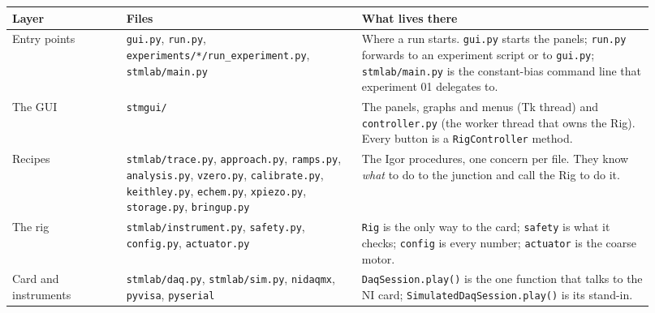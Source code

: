 \small\setlength{\LTleft}{0pt}\setlength{\LTright}{\fill}
\begin{longtable}{@{}>{\raggedright\arraybackslash}p{0.167\linewidth}>{\raggedright\arraybackslash}p{0.335\linewidth}>{\raggedright\arraybackslash}p{0.418\linewidth}@{}}
\toprule
\textbf{Layer} & \textbf{Files} & \textbf{What lives there} \\
\midrule\endhead
Entry points & \texttt{gui.\discretionary{}{}{}py}, \texttt{run.\discretionary{}{}{}py}, \texttt{experiments/\discretionary{}{}{}*/\discretionary{}{}{}run\_\discretionary{}{}{}experiment.\discretionary{}{}{}py}, \texttt{stmlab/\discretionary{}{}{}main.\discretionary{}{}{}py} & Where a run starts. \texttt{gui.\discretionary{}{}{}py} starts the panels; \texttt{run.\discretionary{}{}{}py} forwards to an experiment script or to \texttt{gui.\discretionary{}{}{}py}; \texttt{stmlab/\discretionary{}{}{}main.\discretionary{}{}{}py} is the constant-bias command line that experiment 01 delegates to. \\
The GUI & \texttt{stmgui/\discretionary{}{}{}} & The panels, graphs and menus (Tk thread) and \texttt{controller.\discretionary{}{}{}py} (the worker thread that owns the Rig). Every button is a \texttt{Rig\discretionary{}{}{}Controller} method. \\
Recipes & \texttt{stmlab/\discretionary{}{}{}trace.\discretionary{}{}{}py}, \texttt{approach.\discretionary{}{}{}py}, \texttt{ramps.\discretionary{}{}{}py}, \texttt{analysis.\discretionary{}{}{}py}, \texttt{vzero.\discretionary{}{}{}py}, \texttt{calibrate.\discretionary{}{}{}py}, \texttt{keithley.\discretionary{}{}{}py}, \texttt{echem.\discretionary{}{}{}py}, \texttt{xpiezo.\discretionary{}{}{}py}, \texttt{storage.\discretionary{}{}{}py}, \texttt{bringup.\discretionary{}{}{}py} & The Igor procedures, one concern per file. They know \emph{what} to do to the junction and call the Rig to do it. \\
The rig & \texttt{stmlab/\discretionary{}{}{}instrument.\discretionary{}{}{}py}, \texttt{safety.\discretionary{}{}{}py}, \texttt{config.\discretionary{}{}{}py}, \texttt{actuator.\discretionary{}{}{}py} & \texttt{Rig} is the only way to the card; \texttt{safety} is what it checks; \texttt{config} is every number; \texttt{actuator} is the coarse motor. \\
Card and instruments & \texttt{stmlab/\discretionary{}{}{}daq.\discretionary{}{}{}py}, \texttt{stmlab/\discretionary{}{}{}sim.\discretionary{}{}{}py}, \texttt{nidaqmx}, \texttt{pyvisa}, \texttt{pyserial} & \texttt{Daq\discretionary{}{}{}Session.\discretionary{}{}{}play()} is the one function that talks to the NI card; \texttt{Simulated\discretionary{}{}{}Daq\discretionary{}{}{}Session.\discretionary{}{}{}play()} is its stand-in. \\
\bottomrule
\end{longtable}
\normalsize

